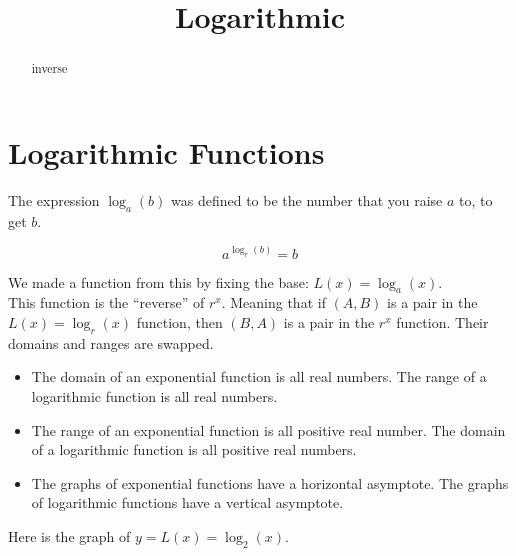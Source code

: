 \documentclass{ximera}
\title{Logarithmic}
\begin{document}
\begin{abstract}
inverse
\end{abstract}
\maketitle


\section*{Logarithmic Functions}




The expression $\log_a(b)$ was defined to be the number that you raise $a$ to, to get $b$.

\[   a^{\log_r(b)} = b  \]




We made a function from this by fixing the base:  $L(x) = \log_a(x)$. \\


This function is the ``reverse'' of $r^x$.  Meaning that if $(A, B)$ is a pair in the $L(x) = \log_r(x)$ function, then $(B, A)$ is a pair in the $r^x$ function. Their domains and ranges are swapped. \\





\begin{itemize}

\item The domain of an exponential function is all real numbers. The range of a logarithmic function is all real numbers.  


\item The range of an exponential function is all positive real number. The domain of a logarithmic function is all positive real numbers.

\item The graphs of exponential functions have a horizontal asymptote. The graphs of logarithmic functions have a vertical asymptote. 

\end{itemize}






Here is the graph of $y = L(x) = \log_2(x)$.
\end{document}
